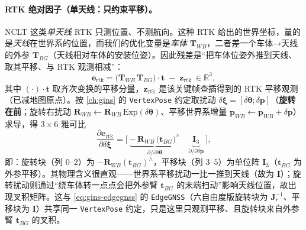 \paragraph{RTK 绝对因子（单天线：只约束平移）。}
NCLT 这类\emph{单天线} RTK 只测位置、不测航向。这种 RTK 给出的世界坐标，量的是\emph{天线}在世界系的位置，而我们的优化变量是\emph{车体} $\mathbf{T}_{WB}$，二者差一个车体→天线的外参 $\mathbf{T}_{BG}$（天线相对车体的安装位姿）。因此残差是“把车体位姿外推到天线、取其平移、与 RTK 观测相减”\cite{gao2023slamad}：
\begin{equation}
\label{eq:lidar-map-rtk-res}
\mathbf{e}_{\text{rtk}}=\Big(\mathbf{T}_{WB}\,\mathbf{T}_{BG}\Big)\!\cdot\!\mathbf{t}\;-\;\mathbf{z}_{\text{rtk}}\ \in\mathbb{R}^3,
\end{equation}
其中 $(\cdot)\!\cdot\!\mathbf{t}$ 取齐次变换的平移分量，$\mathbf{z}_{\text{rtk}}$ 是该关键帧查插得到的 RTK 平移观测（已减地图原点）。按 \cref{ch:gins} 的 \texttt{VertexPose} 约定取扰动 $\delta\boldsymbol{\xi}=[\delta\boldsymbol{\theta};\delta\mathbf{p}]$（\textbf{旋转在前}；旋转右扰动 $\mathbf{R}_{WB}\leftarrow\mathbf{R}_{WB}\,\mathrm{Exp}(\delta\boldsymbol{\theta})$、平移世界系增量 $\mathbf{p}_{WB}\leftarrow\mathbf{p}_{WB}+\delta\mathbf{p}$）求导，得 $3\times6$ 雅可比
\begin{equation}
\label{eq:lidar-map-rtk-jac}
\frac{\partial\mathbf{e}_{\text{rtk}}}{\partial\delta\boldsymbol{\xi}}
=\Big[\ \underbrace{-\,\mathbf{R}_{WB}\,\big(\mathbf{t}_{BG}\big)^\wedge}_{\partial/\partial\delta\boldsymbol{\theta}}\quad
\underbrace{\mathbf{I}_3}_{\partial/\partial\delta\mathbf{p}}\ \Big],
\end{equation}
即：旋转块（列 $0$–$2$）为 $-\mathbf{R}_{WB}(\mathbf{t}_{BG})^\wedge$，平移块（列 $3$–$5$）为单位阵 $\mathbf{I}_3$（$\mathbf{t}_{BG}$ 为外参平移）。其物理含义很直观——世界系平移扰动一比一推到天线（故为 $\mathbf{I}$）；旋转扰动则通过“绕车体转一点点会把外参臂 $\mathbf{t}_{BG}$ 的末端扫动”影响天线位置，故出现叉积矩阵。这与 \cref{eq:gins-edgegnss} 的 \texttt{EdgeGNSS}（六自由度版旋转块为 $\mathbf{J}_r^{-1}$、平移块为 $\mathbf{I}$）共享同一 \texttt{VertexPose} 约定，只是这里只观测平移、且旋转块来自外参臂 $\mathbf{t}_{BG}$ 的叉积。

